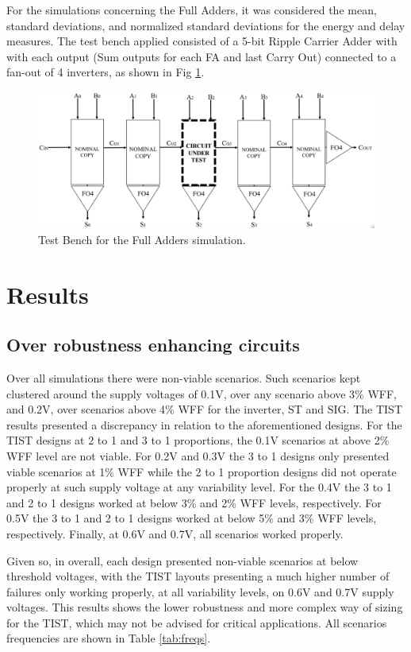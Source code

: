 \documentclass[pgmicro,mestrado,english]{iiufrgs}
\begin{document}
For the simulations concerning the Full Adders, it was considered the mean, standard deviations, and normalized standard deviations for the energy and delay measures. The test bench applied consisted of a 5-bit Ripple Carrier Adder with with each output (Sum outputs for each FA and last Carry Out) connected to a fan-out of 4 inverters, as shown in Fig \ref{fig:tbFA}.

\begin{figure}[H]
\centering
\includegraphics[width=\textwidth, trim={0cm 0cm 0cm 0cm},clip]{testbenchFA.png}
\caption{Test Bench for the Full Adders simulation.}
\label{fig:tbFA}
\end{figure}


\chapter{Results}
\section{Over robustness enhancing circuits}
 Over all simulations there were non-viable scenarios. Such scenarios kept clustered around the supply voltages of 0.1V, over any scenario above 3\% WFF, and 0.2V, over scenarios above 4\% WFF for the inverter, ST and SIG. The TIST results presented a discrepancy in relation to the aforementioned designs. For the TIST designs at 2 to 1 and 3 to 1 proportions, the 0.1V scenarios at above 2\% WFF level are not viable. For 0.2V and 0.3V the 3 to 1 designs only presented viable scenarios at 1\% WFF while the 2 to 1 proportion designs did not operate properly at such supply voltage at any variability level. For the 0.4V the 3 to 1 and 2 to 1 designs worked at below 3\% and 2\% WFF levels, respectively. For 0.5V the 3 to 1 and 2 to 1 designs worked at below 5\% and 3\% WFF levels, respectively. Finally, at 0.6V and 0.7V, all scenarios worked properly. 
 
 Given so, in overall, each design presented non-viable scenarios at below threshold voltages, with the TIST layouts presenting a much higher number of failures only working properly, at all variability levels, on 0.6V and 0.7V supply voltages. This results shows the lower robustness and more complex way of sizing for the TIST, which may not be advised for critical applications. All scenarios frequencies are shown in Table \ref{tab:freqs}.
 
\end{document}
